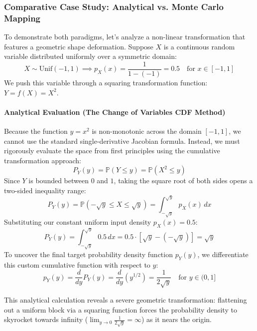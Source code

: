 \documentclass{article}
\begin{document}
\subsubsection*{Comparative Case Study: Analytical vs. Monte Carlo Mapping}

To demonstrate both paradigms, let's analyze a non-linear transformation that features a geometric shape deformation. Suppose $X$ is a continuous random variable distributed uniformly over a symmetric domain:
\begin{equation*}
X \sim \text{Unif}(-1, 1) \implies p_X(x) = \frac{1}{1 - (-1)} = 0.5 \quad \text{for } x \in [-1, 1]
\end{equation*}
We push this variable through a squaring transformation function: $Y = f(X) = X^2$.

\paragraph{Analytical Evaluation (The Change of Variables CDF Method)}
Because the function $y = x^2$ is non-monotonic across the domain $[-1, 1]$, we cannot use the standard single-derivative Jacobian formula. Instead, we must rigorously evaluate the space from first principles using the cumulative transformation approach:
\begin{equation*}
P_Y(y) = \mathbb{P}(Y \le y) = \mathbb{P}(X^2 \le y)
\end{equation*}
Since $Y$ is bounded between $0$ and $1$, taking the square root of both sides opens a two-sided inequality range:
\begin{equation*}
P_Y(y) = \mathbb{P}\left(-\sqrt{y} \le X \le \sqrt{y}\right) = \int_{-\sqrt{y}}^{\sqrt{y}} p_X(x) \, dx
\end{equation*}
Substituting our constant uniform input density $p_X(x) = 0.5$:
\begin{equation}
P_Y(y) = \int_{-\sqrt{y}}^{\sqrt{y}} 0.5 \, dx = 0.5 \cdot \left[ \sqrt{y} - (-\sqrt{y}) \right] = \sqrt{y} \tag{239}
\end{equation}
To uncover the final target probability density function $p_Y(y)$, we differentiate this custom cumulative function with respect to $y$:
\begin{equation}
p_Y(y) = \frac{d}{dy} P_Y(y) = \frac{d}{dy}\left( y^{1/2} \right) = \frac{1}{2\sqrt{y}} \quad \text{for } y \in (0, 1] \tag{240}
\end{equation}

This analytical calculation reveals a severe geometric transformation: flattening out a uniform block via a squaring function forces the probability density to skyrocket towards infinity ($\lim_{y \to 0} \frac{1}{2\sqrt{y}} = \infty$) as it nears the origin.
\end{document}
